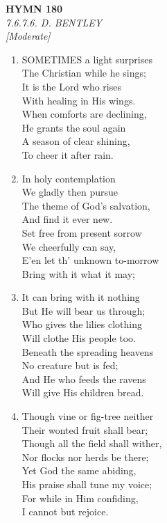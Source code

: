 \documentclass[11pt,a4paper]{article}
\begin{document}
\newpage
\begin{center}
    {\Large \textbf{HYMN 180}}
    \\
    \textit{7.6.7.6. D. BENTLEY}
    \\
    \textit{\small [Moderate]}
\end{center}
\vspace{1em}

\begin{enumerate}
    \item SOMETIMES a light surprises \\
        The Christian while he sings; \\
        It is the Lord who rises \\
        With healing in His wings. \\
        When comforts are declining, \\
        He grants the soul again \\
        A season of clear shining, \\
        To cheer it after rain.

    \item In holy contemplation \\
        We gladly then pursue \\
        The theme of God's salvation, \\
        And find it ever new. \\
        Set free from present sorrow \\
        We cheerfully can say, \\
        E'en let th' unknown to-morrow \\
        Bring with it what it may;

    \item It can bring with it nothing \\
        But He will bear us through; \\
        Who gives the lilies clothing \\
        Will clothe His people too. \\
        Beneath the spreading heavens \\
        No creature but is fed; \\
        And He who feeds the ravens \\
        Will give His children bread.

    \item Though vine or fig-tree neither \\
        Their wonted fruit shall bear; \\
        Though all the field shall wither, \\
        Nor flocks nor herds be there; \\
        Yet God the same abiding, \\
        His praise shall tune my voice; \\
        For while in Him confiding, \\
        I cannot but rejoice.

\end{enumerate}
\end{document}
